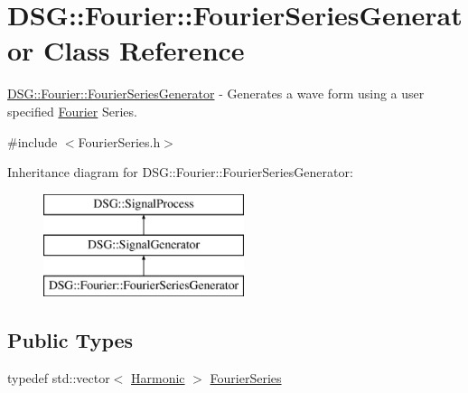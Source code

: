 \hypertarget{class_d_s_g_1_1_fourier_1_1_fourier_series_generator}{\section{D\+S\+G\+:\+:Fourier\+:\+:Fourier\+Series\+Generator Class Reference}
\label{class_d_s_g_1_1_fourier_1_1_fourier_series_generator}
}


\hyperlink{class_d_s_g_1_1_fourier_1_1_fourier_series_generator}{D\+S\+G\+::\+Fourier\+::\+Fourier\+Series\+Generator} -\/ Generates a wave form using a user specified \hyperlink{namespace_d_s_g_1_1_fourier}{Fourier} Series.  




{\ttfamily \#include $<$Fourier\+Series.\+h$>$}

Inheritance diagram for D\+S\+G\+:\+:Fourier\+:\+:Fourier\+Series\+Generator\+:\begin{figure}[H]
\begin{center}
\leavevmode
\includegraphics[height=3.000000cm]{class_d_s_g_1_1_fourier_1_1_fourier_series_generator}
\end{center}
\end{figure}
\subsection*{Public Types}
\begin{DoxyCompactItemize}
\item 
typedef std\+::vector$<$ \hyperlink{class_d_s_g_1_1_fourier_1_1_harmonic}{Harmonic} $>$ \hyperlink{class_d_s_g_1_1_fourier_1_1_fourier_series_generator_a32ffe02b67ac07db92ad41e3ee366c94}{Fourier\+Series}
\end{DoxyCompactItemize}
